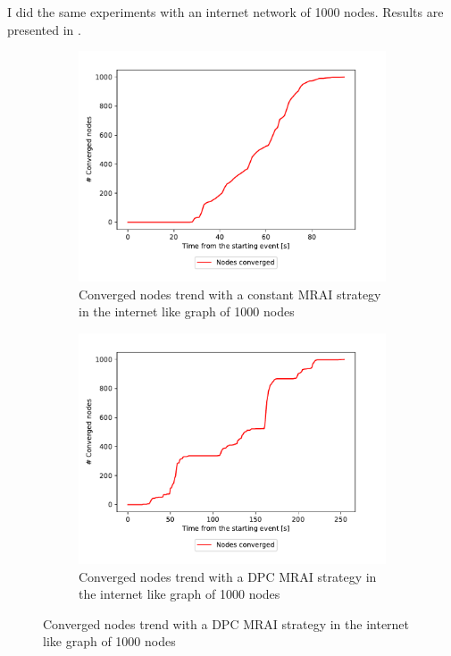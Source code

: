 \documentclass[10pt,conference,letterpaper]{IEEEtran}
\newcommand{\figwidth}{0.78}
\begin{document}
I did the same experiments with an internet network of \num{1000} nodes.
Results are presented in .

\begin{figure}[tb]
	\centering

	\begin{subfigure}{\columnwidth}
		\centering
		\includegraphics[width=\figwidth\columnwidth]{images/internet_like/S_AW/30fixed/converged_nodes-1000-constant-30fixed.pdf}
		\caption{Converged nodes trend with a constant \ac{MRAI} strategy in the internet like graph of \num{1000} nodes}
		\label{fig:s_aw_converged_nodes_constant_1000}
		\qquad
	\end{subfigure}

	\begin{subfigure}{\columnwidth}
		\centering
		\includegraphics[width=\figwidth\columnwidth]{images/internet_like/S_AW/30fixed/converged_nodes-1000-dpc-30fixed.pdf}
		\caption{Converged nodes trend with a \ac{DPC} \ac{MRAI} strategy in the internet like graph of \num{1000} nodes}
		\label{fig:s_aw_converged_nodes_dpc_1000}
		\qquad
	\end{subfigure}


\end{figure}
\end{document}
